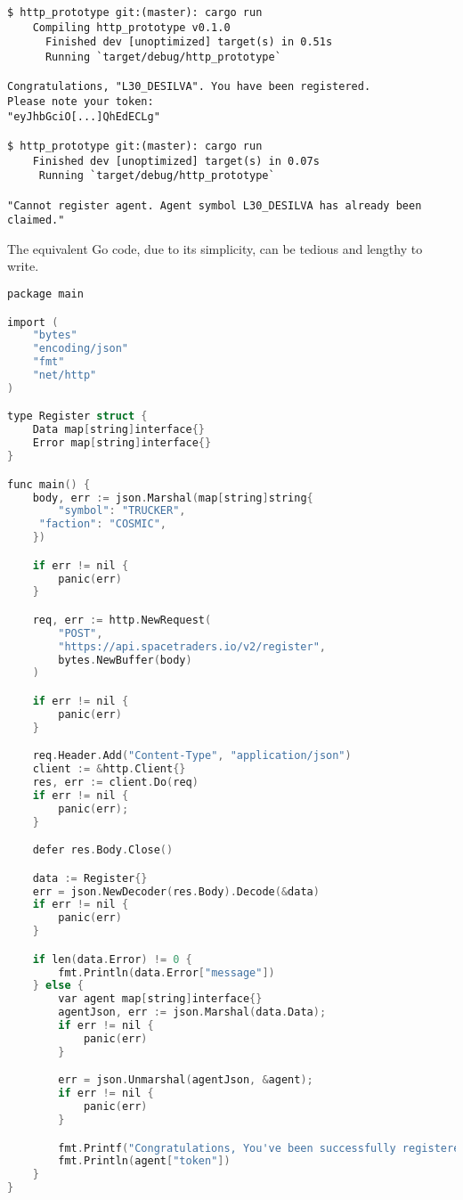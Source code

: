 \begin{lstlisting}
$ http_prototype git:(master): cargo run
    Compiling http_prototype v0.1.0 
      Finished dev [unoptimized] target(s) in 0.51s
      Running `target/debug/http_prototype`

Congratulations, "L30_DESILVA". You have been registered.
Please note your token:
"eyJhbGciO[...]QhEdECLg"

$ http_prototype git:(master): cargo run
    Finished dev [unoptimized] target(s) in 0.07s
     Running `target/debug/http_prototype`

"Cannot register agent. Agent symbol L30_DESILVA has already been claimed." 

\end{lstlisting}

The equivalent Go code, due to its simplicity, can be tedious and lengthy to write. 

\begin{lstlisting}[language=C]
package main

import (
	"bytes"
	"encoding/json"
	"fmt"
	"net/http"
)

type Register struct {
    Data map[string]interface{}
    Error map[string]interface{}
}

func main() {
    body, err := json.Marshal(map[string]string{
        "symbol": "TRUCKER",
	 "faction": "COSMIC",
    }) 

    if err != nil {
        panic(err)
    }

    req, err := http.NewRequest(
        "POST",       
        "https://api.spacetraders.io/v2/register", 
        bytes.NewBuffer(body)
    )

    if err != nil {
        panic(err)
    }

    req.Header.Add("Content-Type", "application/json")
    client := &http.Client{}
    res, err := client.Do(req)
    if err != nil {
        panic(err);
    }

    defer res.Body.Close()

    data := Register{}
    err = json.NewDecoder(res.Body).Decode(&data)
    if err != nil {
        panic(err)
    }

    if len(data.Error) != 0 {
        fmt.Println(data.Error["message"])
    } else {
        var agent map[string]interface{}
        agentJson, err := json.Marshal(data.Data);
        if err != nil {
            panic(err)
        }

        err = json.Unmarshal(agentJson, &agent);
        if err != nil {
            panic(err)
        }

        fmt.Printf("Congratulations, You've been successfully registered. Please note your access token:\n")
        fmt.Println(agent["token"])
    }
}
\end{lstlisting}

